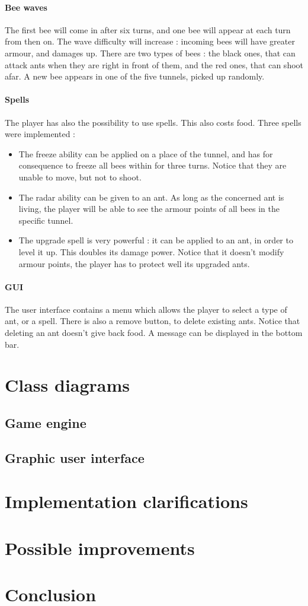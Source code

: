 \documentclass[a4paper]{article}
\begin{document}
\paragraph{Bee waves} The first bee will come in after six turns, and one bee will appear at each turn from then on. The wave difficulty will increase : incoming bees will have greater armour, and damages up. There are two types of bees : the black ones, that can attack ants when they are right in front of them, and the red ones, that can shoot afar. A new bee appears in one of the five tunnels, picked up randomly.

\paragraph{Spells} The player has also the possibility to use spells. This also costs food. Three spells were implemented :

\begin{itemize}
	\item The freeze ability can be applied on a place of the tunnel, and has for consequence to freeze all bees within for three turns. Notice that they are unable to move, but not to shoot.
	\item The radar ability can be given to an ant. As long as the concerned ant is living, the player will be able to see the armour points of all bees in the specific tunnel.
	\item The upgrade spell is very powerful : it can be applied to an ant, in order to level it up. This doubles its damage power. Notice that it doesn't modify armour points, the player has to protect well its upgraded ants.
\end{itemize}

\paragraph{GUI} The user interface contains a menu which allows the player to select a type of ant, or a spell. There is also a remove button, to delete existing ants. Notice that deleting an ant doesn't give back food. A message can be displayed in the bottom bar.


\section{Class diagrams}

	\subsection{Game engine}
	\subsection{Graphic user interface}


\section{Implementation clarifications}


\section{Possible improvements}


\section*{Conclusion}
\end{document}

